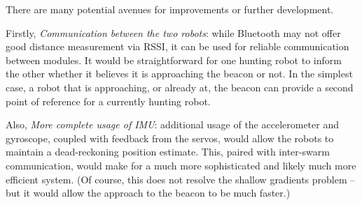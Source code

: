 \documentclass[]{article}
\begin{document}
There are many potential avenues for improvements or further
development.

Firstly, \emph{Communication between the two robots}: while Bluetooth may not offer good distance measurement via RSSI, it can be used for reliable  communication between modules.
It would be straightforward for one hunting robot to inform the other whether it believes it is approaching the beacon or not.
In the simplest case, a robot that is approaching, or already at, the beacon can provide a second point of reference for a currently hunting robot.

Also, \emph{More complete usage of IMU}: additional usage of the accelerometer and gyroscope, coupled with feedback from the servos, would allow the robots to maintain a dead-reckoning position estimate.
This, paired with inter-swarm communication, would make for a much more sophisticated and likely much more efficient system.
(Of course, this does not resolve the shallow gradients problem -- but it would allow the approach to the beacon to be much faster.)

{}

\end{document}
